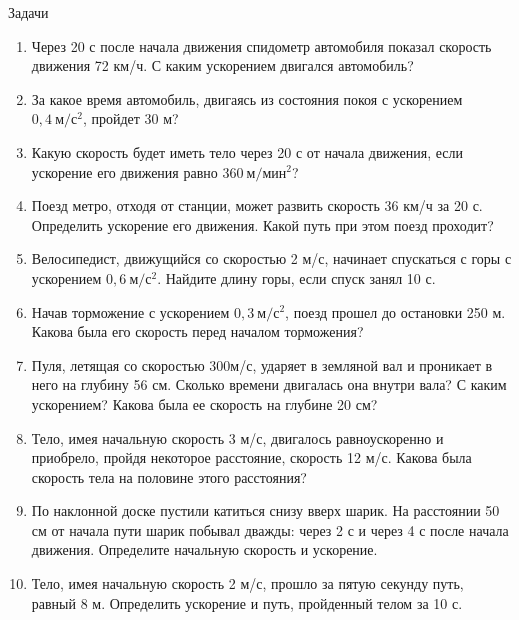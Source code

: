 \documentclass[a6paper, 11pt]{diss_4}
\renewcommand{\'}{\,'}
\begin{document}
\begin{center}
   Задачи
\end{center}
\begin{enumerate}
\item Через 20 с после начала движения спидометр автомобиля показал скорость движения 72 км/ч. С каким ускорением двигался автомобиль?
\item За какое время автомобиль, двигаясь из состояния покоя с ускорением $0,4\ м/с^2$, пройдет 30 м?
\item Какую скорость будет иметь тело через 20 с от начала движения, если ускорение его движения равно $360\ м/мин^2$?
\item Поезд метро, отходя от станции, может развить скорость 36 км/ч за 20 с. Определить ускорение его движения. Какой путь при этом поезд проходит?
\item Велосипедист, движущийся со скоростью 2 м/с, начинает спускаться с горы с ускорением $0,6\ м/с^2$. Найдите длину горы, если спуск занял 10 с.
\item Начав торможение с ускорением $0,3\ м/с^2$, поезд прошел до остановки 250 м. Какова была его скорость перед началом торможения?
\item Пуля, летящая со скоростью 300м/с, ударяет в земляной вал и проникает в него на глубину 56 см. Сколько времени двигалась она внутри вала? С каким ускорением? Какова была ее скорость на глубине 20 см?
\item Тело, имея начальную скорость 3 м/с, двигалось равноускоренно и приобрело, пройдя некоторое расстояние, скорость 12 м/с. Какова была скорость тела на половине этого расстояния?
\item По наклонной доске пустили катиться снизу вверх шарик. На расстоянии 50 см от начала пути шарик побывал дважды: через 2 с и через 4 с после начала движения. Определите начальную скорость и ускорение.
\item Тело, имея начальную скорость 2 м/с, прошло за пятую секунду путь, равный 8 м. Определить ускорение и путь, пройденный телом за 10 с.
\end{enumerate}
\end{document}
